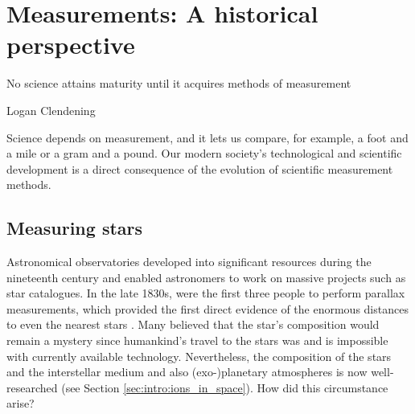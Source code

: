 \section{Measurements: A historical perspective}
\label{sec:intro:measurements}

\epigraph{No science attains maturity until it acquires methods of measurement}{Logan Clendening}

Science depends on measurement, and it lets us compare, for example, a foot and a mile or a gram and a pound. Our modern society's technological and scientific development is a direct consequence of the evolution of scientific measurement methods.

\subsection{Measuring stars}
\dropcap A{stronomical} observatories developed into significant resources during the nineteenth century and enabled astronomers to work on massive projects such as star catalogues. In the late 1830s, \citet{bessel_parallax_1838, henderson_parallax_1840, struve_stellarum_1837} were the first three people to perform parallax measurements, which provided the first direct evidence of the enormous distances to even the nearest stars \cite{reid_first_2020}. Many believed that the star's composition would remain a mystery since humankind's travel to the stars was and is impossible with currently available technology. Nevertheless, the composition of the stars and the interstellar medium and also (exo-)planetary atmospheres is now well-researched (see Section \ref{sec:intro:ions_in_space}). How did this circumstance arise?

